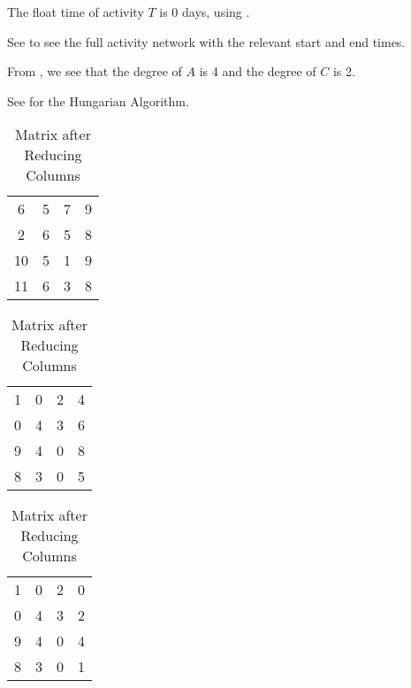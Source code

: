 \begin{subquestions}
\begin{subsubquestions}
\subsubquestion

The float time of activity $T$ is 0 days, using .

\end{subsubquestions}

See  to see the full activity network with the relevant start and end times.


\subquestion

From , we see that the degree of $A$ is 4 and the degree of $C$ is 2.


\subquestion

\begin{subsubquestions}

\subsubquestion 

See  for the Hungarian Algorithm.

\begin{table}[!hbt]
	\begin{minipage}{0.3\textwidth}
		\centering
		\begin{tabular}{cccc}
			6 & 5 & 7 & 9 \\
			2 & 6 & 5 & 8 \\
			10 & 5 & 1 & 9 \\
			11 & 6 & 3 & 8 \\
		\end{tabular}
		\captionsetup{width=1.1\linewidth}
		\caption*{Matrix From question}
	\end{minipage}
	\hspace{20pt}
	\begin{minipage}{0.3\textwidth}
		\centering
		\begin{tabular}{cccc}
			1 & 0 & 2 & 4 \\
			0 & 4 & 3 & 6 \\
			9 & 4 & 0 & 8 \\
			8 & 3 & 0 & 5 \\
		\end{tabular}
		\captionsetup{width=1.1\linewidth}
		\caption*{Matrix after Reducing Rows}
	\end{minipage}
	\hspace{20pt}
	\begin{minipage}{0.3\textwidth}
		\centering
		\begin{tabular}{cccc}
			1 & 0 & 2 & 0 \\
			0 & 4 & 3 & 2 \\
			9 & 4 & 0 & 4 \\
			8 & 3 & 0 & 1 \\
		\end{tabular}
		\captionsetup{width=1.1\linewidth}
		\caption*{Matrix after Reducing Columns} 
	\end{minipage}
	

\end{table}
\end{subsubquestions}
\end{subquestions}
